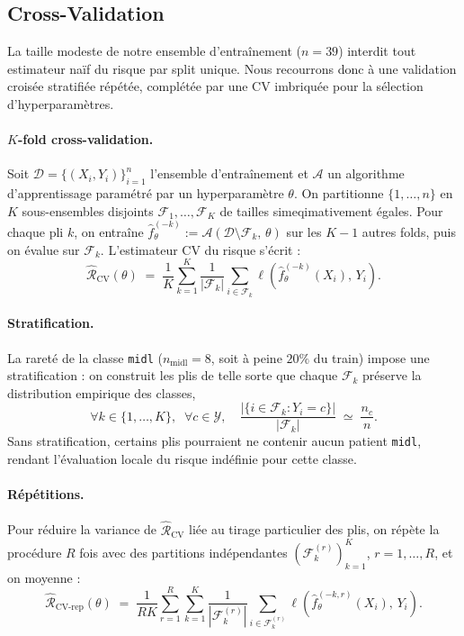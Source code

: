 \documentclass[a4paper,11pt]{paper}
\theoremstyle{plain}
\theoremstyle{definition}
\theoremstyle{remark}
\begin{document}
\subsection{Cross-Validation}

La taille modeste de notre ensemble d'entraînement ($n=39$) interdit tout estimateur naïf du risque par split unique. Nous recourrons donc à une validation croisée stratifiée répétée, complétée par une CV imbriquée pour la sélection d'hyperparamètres.

\paragraph{$K$-fold cross-validation.}
Soit $\mathcal{D} = \{(X_i, Y_i)\}_{i=1}^{n}$ l'ensemble d'entraînement et $\mathcal{A}$ un algorithme d'apprentissage paramétré par un hyperparamètre $\theta$. On partitionne $\{1,\dots,n\}$ en $K$ sous-ensembles disjoints $\mathcal{F}_1, \dots, \mathcal{F}_K$ de tailles simeqimativement égales. Pour chaque pli $k$, on entraîne $\hat f^{(-k)}_\theta := \mathcal{A}(\mathcal{D}
    \setminus \mathcal{F}_k,\, \theta)$ sur les $K-1$ autres folds, puis on évalue sur $\mathcal{F}_k$. L'estimateur CV du risque s'écrit :
\[
    \widehat{\mathcal{R}}_{\mathrm{CV}}(\theta)
    \;=\;
    \frac{1}{K}\sum_{k=1}^{K}
    \frac{1}{|\mathcal{F}_k|}\sum_{i \in \mathcal{F}_k}
    \ell\!\left(\hat f^{(-k)}_\theta(X_i),\, Y_i\right).
\]

\paragraph{Stratification.}
La rareté de la classe \texttt{midl} ($n_{\text{midl}} = 8$, soit à peine $20\%$ du train) impose une stratification : on construit les plis de telle sorte que chaque $\mathcal{F}_k$ préserve la distribution empirique des classes,
\[
    \forall k \in \{1,\dots,K\},\;\; \forall c \in \mathcal{Y},\quad
    \frac{|\{i \in \mathcal{F}_k : Y_i = c\}|}{|\mathcal{F}_k|}
    \;\simeq\;
    \frac{n_c}{n}.
\]
Sans stratification, certains plis pourraient ne contenir aucun patient \texttt{midl}, rendant l'évaluation locale du risque indéfinie pour cette classe.

\paragraph{Répétitions.}
Pour réduire la variance de $\widehat{\mathcal{R}}_{\mathrm{CV}}$ liée au tirage particulier des plis, on répète la procédure $R$ fois avec des partitions indépendantes $(\mathcal{F}_k^{(r)})_{k=1}^{K}$, $r=1,\dots,R$, et on moyenne :
\[
    \widehat{\mathcal{R}}_{\mathrm{CV}\text{-rep}}(\theta)
    \;=\;
    \frac{1}{R  K}\sum_{r=1}^{R}\sum_{k=1}^{K}
    \frac{1}{|\mathcal{F}_k^{(r)}|}\sum_{i \in \mathcal{F}_k^{(r)}}
    \ell\!\left(\hat f^{(-k,r)}_\theta(X_i),\, Y_i\right).
\]
\end{document}
